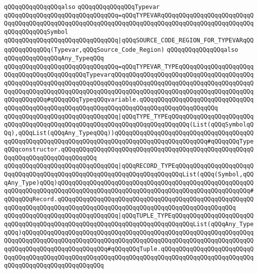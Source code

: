 \newline
\verb|qQQqqQQqqQQqqQQqalso|\newline
\verb|qQQqqQQqqQQqqQQqTypevar|\newline
\newline
\verb|qQQqqQQqqQQqqQQqqQQqqQQqqQQqqQQq=qQQqTYPEVARqQQqqQQqqQQqqQQqqQQqqQQqqQQqqQQqqQQqqQQqqQQqqQQqqQQqqQQqqQQqqQQqqQQqqQQqqQQqqQQqqQQqqQQqqQQqqQQqqQQqqQQqqQQqSymbol|\newline
\verb|qQQqqQQqqQQqqQQqqQQqqQQqqQQqqQQq|\verb#|qQQqSOURCE_CODE_REGION_FOR_TYPEVARqQQqqQQqqQQqqQQq(Typevar,qQQqSource_Code_Region)#\newline
\newline
\newline
\newline
\verb|qQQqqQQqqQQqqQQqalso|\newline
\verb|qQQqqQQqqQQqqQQqAny_TypeqQQq|\newline
\newline
\verb|qQQqqQQqqQQqqQQqqQQqqQQqqQQqqQQq=qQQqTYPEVAR_TYPEqQQqqQQqqQQqqQQqqQQqqQQqqQQqqQQqqQQqqQQqqQQqTypevarqQQqqQQqqQQqqQQqqQQqqQQqqQQqqQQqqQQqqQQqqQQqqQQqqQQqqQQqqQQqqQQqqQQqqQQqqQQqqQQqqQQqqQQqqQQqqQQqqQQqqQQqqQQqqQQqqQQqqQQqqQQqqQQqqQQqqQQqqQQqqQQqqQQqqQQqqQQqqQQqqQQqqQQqqQQqqQQqqQQqqQQqqQQqqQQq#qQQqqQQqTypeqQQqvariable.qQQqqQQqqQQqqQQqqQQqqQQqqQQqqQQqqQQqqQQqqQQqqQQqqQQqqQQqqQQqqQQqqQQqqQQqqQQqqQQqqQQqqQQqqQQq|\newline
\verb|qQQqqQQqqQQqqQQqqQQqqQQqqQQqqQQq|\verb#|qQQqTYPE_TYPEqQQqqQQqqQQqqQQqqQQqqQQqqQQqqQQqqQQqqQQqqQQqqQQqqQQqqQQqqQQqqQQqqQQqqQQqqQQq(List(qQQqSymbolqQQq),qQQqList(qQQqAny_TypeqQQq))qQQqqQQqqQQqqQQqqQQqqQQqqQQqqQQqqQQqqQQqqQQqqQQqqQQqqQQqqQQqqQQqqQQqqQQqqQQqqQQqqQQqqQQqqQQqqQQq#\verb|#qQQqqQQqTypeqQQqconstructor.qQQqqQQqqQQqqQQqqQQqqQQqqQQqqQQqqQQqqQQqqQQqqQQqqQQqqQQqqQQqqQQqqQQqqQQqqQQqqQQq|\newline
\verb|qQQqqQQqqQQqqQQqqQQqqQQqqQQqqQQq|\verb#|qQQqRECORD_TYPEqQQqqQQqqQQqqQQqqQQqqQQqqQQqqQQqqQQqqQQqqQQqqQQqqQQqqQQqqQQqqQQqqQQqqQQqList(qQQq(Symbol,qQQqAny_Type)qQQq)qQQqqQQqqQQqqQQqqQQqqQQqqQQqqQQqqQQqqQQqqQQqqQQqqQQqqQQqqQQqqQQqqQQqqQQqqQQqqQQqqQQqqQQqqQQqqQQqqQQqqQQqqQQqqQQqqQQqqQQqqQQq#\verb|#qQQqqQQqRecord.qQQqqQQqqQQqqQQqqQQqqQQqqQQqqQQqqQQqqQQqqQQqqQQqqQQqqQQqqQQqqQQqqQQqqQQqqQQqqQQqqQQqqQQqqQQqqQQqqQQqqQQqqQQqqQQqqQQqqQQq|\newline
\verb|qQQqqQQqqQQqqQQqqQQqqQQqqQQqqQQq|\verb#|qQQqTUPLE_TYPEqQQqqQQqqQQqqQQqqQQqqQQqqQQqqQQqqQQqqQQqqQQqqQQqqQQqqQQqqQQqqQQqqQQqqQQqqQQqList(qQQqAny_TypeqQQq)qQQqqQQqqQQqqQQqqQQqqQQqqQQqqQQqqQQqqQQqqQQqqQQqqQQqqQQqqQQqqQQqqQQqqQQqqQQqqQQqqQQqqQQqqQQqqQQqqQQqqQQqqQQqqQQqqQQqqQQqqQQqqQQqqQQqqQQqqQQqqQQqqQQqqQQqqQQqqQQqqQQq#\verb|#qQQqqQQqTuple.qQQqqQQqqQQqqQQqqQQqqQQqqQQqqQQqqQQqqQQqqQQqqQQqqQQqqQQqqQQqqQQqqQQqqQQqqQQqqQQqqQQqqQQqqQQqqQQqqQQqqQQqqQQqqQQqqQQqqQQqqQQq|\newline
